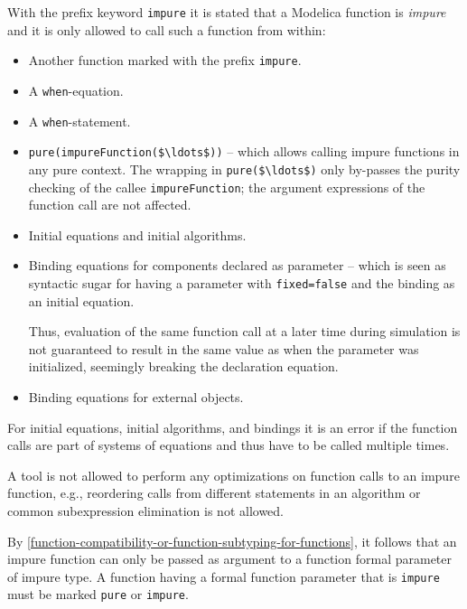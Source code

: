 With the prefix keyword \lstinline!impure! it is stated that a Modelica function is \emph{impure} and it is only allowed to call such a function from within:
\begin{itemize}
\item
  Another function marked with the prefix \lstinline!impure!.
\item
  A \lstinline!when!-equation.
\item
  A \lstinline!when!-statement.
\item
  \lstinline!pure(impureFunction($\ldots$))! -- which allows calling impure functions in any pure context.
  The wrapping in \lstinline!pure($\ldots$)! only by-passes the purity checking of the callee \lstinline!impureFunction!; the argument expressions of the function call are not affected.
\item
  Initial equations and initial algorithms.
\item
  Binding equations for components declared as parameter -- which is seen as syntactic sugar for having a parameter with \lstinline!fixed=false! and the binding as an initial equation.
  \begin{nonnormative}
  Thus, evaluation of the same function call at a later time during simulation is not guaranteed to result in the same value as when the parameter
  was initialized, seemingly breaking the declaration equation.
  \end{nonnormative}
\item
  Binding equations for external objects.
\end{itemize}

For initial equations, initial algorithms, and bindings it is an error
if the function calls are part of systems of equations and thus have to
be called multiple times.

\begin{nonnormative}
A tool is not allowed to perform any optimizations on function
calls to an impure function, e.g., reordering calls from different
statements in an algorithm or common subexpression elimination is not
allowed.
\end{nonnormative}

By \cref{function-compatibility-or-function-subtyping-for-functions}, it follows that an impure function can only be passed as argument to a function formal parameter of impure type.
A function having a formal function parameter that is \lstinline!impure! must be marked \lstinline!pure! or \lstinline!impure!.

